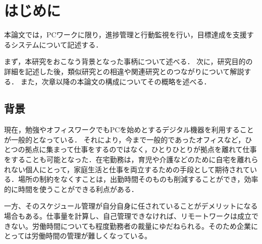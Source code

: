 \chapter{はじめに}
本論文では，PCワークに限り，進捗管理と行動監視を行い，目標達成を支援するシステムについて記述する．

まず，本研究をおこなう背景となった事柄について述べる．
次に，研究目的の詳細を記述した後，類似研究との相違や関連研究とのつながりについて解説する．
また，次章以降の本論文の構成についてその概略を述べる．

\section{背景}
現在，勉強やオフィスワークでもPCを始めとするデジタル機器を利用することが一般的となっている．
それにより，今まで一般的であったオフィスなど，ひとつの拠点に集まって仕事をするのではなく，ひとりひとりが拠点を離れて仕事をすることも可能となった．在宅勤務は，育児や介護などのために自宅を離れられない個人にとって，家庭生活と仕事を両立するための手段として期待されている．場所の制約をなくすことは，出勤時間そのものも削減することができ，効率的に時間を使うことができる利点がある．

一方、そのスケジュール管理が自分自身に任されていることがデメリットになる場合もある。仕事量を計算し、自己管理できなければ、リモートワークは成立できない。労働時間についても程度勤務者の裁量にゆだねられる。そのため企業にとっては労働時間の管理が難しくなっている。


